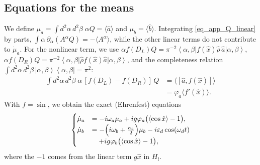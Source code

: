 \documentclass[aps,prx,reprint,floatfix,amsmath,amssymb,longbibliography]{revtex4-2}
\newcommand{\ket}[1]{\left|#1\right\rangle}
\newcommand{\bra}[1]{\left\langle#1\right|}
\newcommand{\eps}{\varepsilon}
\newcommand{\ha}{\hat{a}}
\newcommand{\hb}{\hat{b}}
\begin{document}
\subsection{Equations for the means}
We define $\mu_a=\int d^2\alpha\,d^2\beta\;\alpha Q=\langle\ha\rangle$ and $\mu_b=\langle\hb\rangle$. Integrating \cref{eq_app_Q_linear} by parts, $\int\alpha\,\partial_\alpha(A^\alpha Q)=-\langle A^\alpha\rangle$, while the other linear terms do not contribute to $\dot\mu_a$. For the nonlinear term, we use $\alpha f(D_L)Q=\pi^{-2}\bra{\alpha,\beta}f(\hat x)\hat\rho\,\ha\ket{\alpha,\beta}$, $\alpha f(D_R)Q=\pi^{-2}\bra{\alpha,\beta}\hat\rho f(\hat x)\ha\ket{\alpha,\beta}$, and the completeness relation $\int d^2\alpha\,d^2\beta\,\ket{\alpha,\beta}\bra{\alpha,\beta}=\pi^2$:
\begin{equation}
\begin{split}
    \int d^2\alpha\,d^2\beta\;\alpha\,[f(D_L)-f(D_R)]\,Q
    &=\langle[\ha,f(\hat x)]\rangle\\
    &=\varphi_a\langle f'(\hat x)\rangle .
\end{split}
\end{equation}
With $f=\sin$, we obtain the exact (Ehrenfest) equations
\begin{equation}
\begin{cases}
    \dot\mu_a &= -i\omega_a\mu_a+ig\varphi_a\bigl(\langle\cos\hat x\rangle-1\bigr),\\
    \dot\mu_b &= -\Bigl(i\omega_b+\frac{\kappa_b}{2}\Bigr)\mu_b-i\eps_d\cos(\omega_d t)\nonumber\\
    &\quad+ig\varphi_b\bigl(\langle\cos\hat x\rangle-1\bigr),
\end{cases}
\label{eq_app_mu}
\end{equation}
where the $-1$ comes from the linear term $g\hat x$ in $H_l$.
\end{document}
